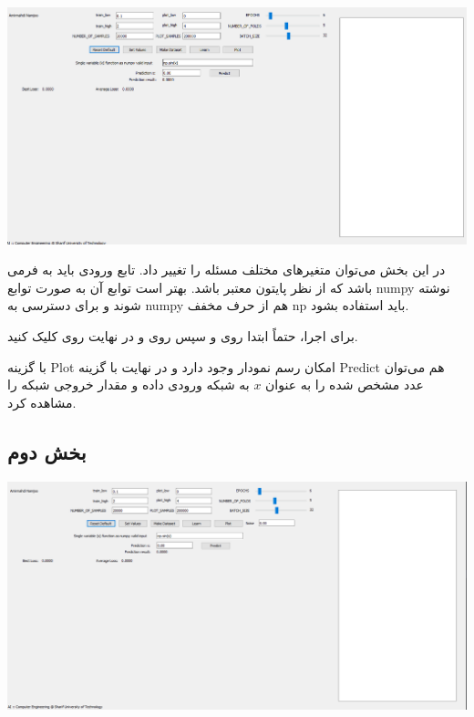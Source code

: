 \documentclass[12pt,titlepage,a4page , tikz , multi,table , svgnames,xcdraw]{article}
\begin{document}
\begin{center}

 \includegraphics[width=1.1\textwidth]{pictures/24.png}

\end{center}

در این بخش می‌توان متغیرهای مختلف مسئله را تغییر داد. تابع ورودی باید به فرمی باشد که از نظر پایتون معتبر باشد. بهتر است توابع آن به صورت توابع numpy نوشته شوند و برای دسترسی به numpy هم از حرف مخفف np باید استفاده بشود.

برای اجرا، حتماً ابتدا روی و سپس روی  و در نهایت روی  کلیک کنید.

با گزینه Plot امکان رسم نمودار وجود دارد و در نهایت با گزینه Predict هم می‌توان عدد مشخص شده را به عنوان $x$ به شبکه ورودی داده و مقدار خروجی شبکه را مشاهده کرد.


\newpage


\subsection{بخش دوم}

\begin{center}

 \includegraphics[width=1.1\textwidth]{pictures/25.png}

\end{center}
\end{document}
